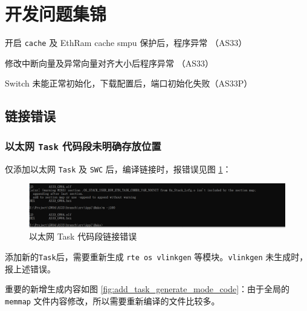 \section{开发问题集锦}

\begin{introduction}
    \item {}
    \item {}
    \item {}
    \item 开启 \lstinline{cache} 及 EthRam cache smpu 保护后，程序异常 （AS33）
    \item 修改中断向量及异常向量对齐大小后程序异常 （AS33）
    \item Switch 未能正常初始化，下载配置后，端口初始化失败（AS33P）
\end{introduction}

\subsection{链接错误}
\subsubsection{以太网 \lstinline{Task} 代码段未明确存放位置}\label{subsubsec:eth_ld_task_error}
仅添加以太网 \lstinline{Task} 及 \lstinline{SWC} 后，编译链接时，报错误见图 \ref{fig:ld_error_eth_task}：

\begin{figure}[htbp]
    \centering
    \includegraphics[scale=0.6]{pic/eth_ld_error_task.png}
    \caption{以太网 Task 代码段链接错误}
    \label{fig:ld_error_eth_task}
\end{figure}

添加新的\lstinline{Task}后，需要重新生成 \lstinline{rte os vlinkgen} 等模块。\lstinline{vlinkgen} 未生成时，报上述错误。

重要的新增生成内容如图 \ref{fig:add_task_generate_mode_code}：由于全局的 \lstinline{memmap} 文件内容修改，所以需要重新编译的文件比较多。

